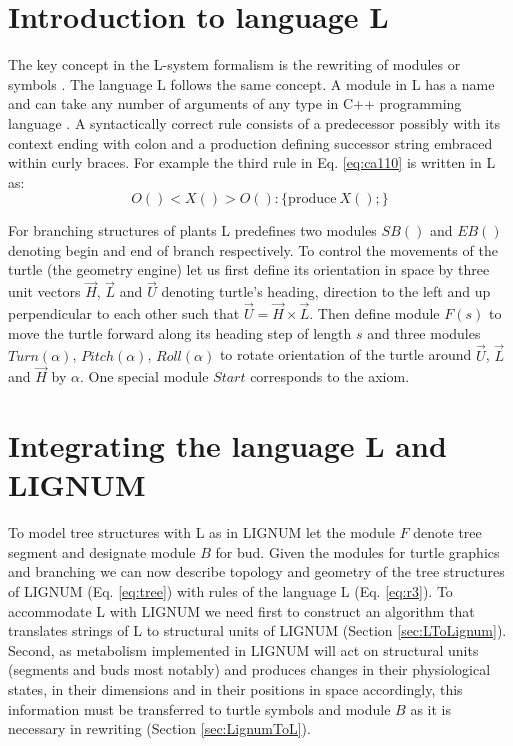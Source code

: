 \section{Introduction to language L}

The key concept in the  L-system formalism is the rewriting of modules
or symbols \citep{pp:89}.  The language  L follows the same concept. A
module in  L has a name  and can take  any number of arguments  of any
type   in   C++   programming   language   \citep{stroustrup:97}.    A
syntactically correct rule consists of a predecessor possibly with its
context ending  with colon and a production  defining successor string
embraced within curly braces.  For example the third rule in Eq.
\ref{eq:ca110} is written in L as:
\begin{equation}\label{eq:r3}
 O() < X() > O(): \{\mathrm{produce}\ X();\}
\end{equation}

For branching structures of plants L predefines two modules $SB()$ and
$EB()$ denoting begin and end  of branch respectively.  To control the
movements of the turtle (the  geometry engine) let us first define its
orientation  in space by  three unit  vectors $\vec  H$, $\vec  L$ and
$\vec  U$ denoting  turtle's heading,  direction  to the  left and  up
perpendicular to each other such that $\vec U = \vec H \times \vec L$.
Then define module $F(s)$ to move the turtle forward along its heading
step of length $s$  and three modules $Turn(\alpha)$, $Pitch(\alpha)$,
$Roll(\alpha)$ to  rotate orientation of  the turtle around  $\vec U$,
$\vec  L$  and $\vec  H$  by  $\alpha$.   One special  module  $Start$
corresponds to the axiom.


\section{Integrating the language L and LIGNUM}\label{sec:pine}

To model tree structures with L as in LIGNUM let the module $F$ denote
tree segment and designate module  $B$ for bud.  Given the modules for
turtle  graphics  and  branching  we  can now  describe  topology  and
geometry of  the tree structures  of LIGNUM (Eq.   \ref{eq:tree}) with
rules of  the language  L (Eq.  \ref{eq:r3}).   To accommodate  L with
LIGNUM we need first to construct an algorithm that translates strings
of L to structural units of LIGNUM (Section \ref{sec:LToLignum}).  Second,
as  metabolism implemented  in  LIGNUM will  act  on structural  units
(segments  and  buds  most  notably)  and produces  changes  in  their
physiological states,  in their dimensions  and in their  positions in
space  accordingly, this  information  must be  transferred to  turtle
symbols  and module  $B$  as  it is  necessary  in rewriting  (Section
\ref{sec:LignumToL}).


